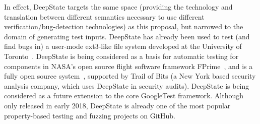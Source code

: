 In effect, DeepState targets the same space (providing the technology and translation between different semantics necessary to use different verification/bug-detection technologies) as this proposal, but narrowed to the domain of generating test inputs.
DeepState has already been used to test (and find bugs in) a user-mode ext3-like file system developed at the University of Toronto~\cite{testfs,testfsrepo}.
DeepState is being considered as a basis for automatic testing for components in NASA's open source flight software framework FPrime~\cite{fprime,fprimerepo}, and is a fully open source system~\cite{deepstaterepo}, supported by Trail of Bits (a New York based security analysis company, which uses DeepState in security audits).  DeepState is being considered as a future extension to the core GoogleTest framework.  Although only released in early 2018, DeepState is already one of the most popular property-based testing and fuzzing projects on GitHub.